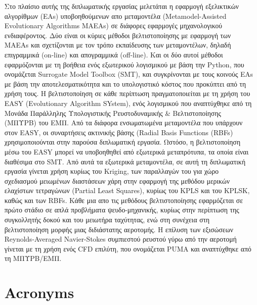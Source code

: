 \documentclass[twoside, 12pt,notitlepage]{report}
\begin{document}
Στο πλαίσιο αυτής της διπλωματικής εργασίας μελετάται η 
εφαρμογή εξελικτικών αλγορίθμων (EAs) υποβοηθούμενων απο 
μεταμοντέλα (Metamodel-Assisted Evolutionary Algorithms MAEAs) σε 
διάφορες εφαρμογές μηχανολογικού ενδιαφέροντος. Δύο είναι οι κύριες 
μέθοδοι βελτιστοποίησης με εφαρμογή των MAEAs και σχετίζονται με 
τον τρόπο εκπαίδευσης των μεταμοντέλων, δηλαδή επιγραμμικά 
(on-line) και απογραμμικά (off-line). Και οι δύο αυτοί μέθοδοι 
εφαρμόζονται με τη βοήθεια ενός εξωτερικού λογισμικού με βάση την 
Python, που ονομάζεται Surrogate Model Toolbox (SMT), και 
συγκρίνονται με τους κοινούς ΕΑs με βάση την αποτελεσματικότητα και 
το υπολογιστικό κόστος που προκύπτει από τη χρήση τους. Η 
βελτιστοποίηση σε κάθε περίπτωση πραγματοποιείται με τη χρήση του 
EASY (Evolutionary Algorithm SYstem), ενός λογισμικού που 
αναπτύχθηκε από τη Μονάδα Παράλληλης Υπολογιστικής Ρευστοδυναμικής 
\& Βελτιστοποίησης (ΜΠΥΡΒ) του ΕΜΠ. Από τα διάφορα ενσωματωμένα 
μεταμοντέλα που υπάρχουν στον EASY, οι συναρτήσεις ακτινικής 
βάσης (Radial Basis Functions (RBFs) χρησιμοποιούνται στην παρούσα 
διπλωματική εργασία. Ωστόσο, η βελτιστοποίηση μέσω του EASY 
μπορεί να υποβοηθηθεί από εξωτερικά μεταπρότυπα, τα οποία είναι 
διαθέσιμα στο SMT. Από αυτά τα εξωτερικά μεταμοντέλα, σε αυτή τη 
διπλωματική εργασία γίνεται χρήση κυρίως του Kriging, των 
παραλλαγών του για χώρο σχεδιασμού μειωμένων διαστάσεων χάρη στην 
εφαρμογή της μεθόδου μερικών ελαχίστων τετραγώνων (Partial Least 
Squares), κυρίως του KPLS και του KPLSK, καθώς και των RBFs. Κάθε 
μια απο τις μεθόδους βελτιστοποίησης εφαρμόζεται σε πρώτο στάδιο σε 
απλά προβλήματα ψευδο-μηχανικής, κυρίως στην περίπτωση της 
συγκολλητής δοκού και του μειωτήρα ταχύτητας, ενώ στη 
συνέχεια στη βελτιστοποίηση μορφής μιας διδιάστατης αεροτομής. Η 
επίλυση των εξισώσεων Reynolds-Averaged Navier-Stokes συμπιεστού 
ρευστού γύρω από την αεροτομή γίνεται με τη χρήση ενός CFD επιλύτη, 
που ονομάζεται PUMA και αναπτύχθηκε από τη ΜΠΥΡΒ/ΕΜΠ.

\newpage

\chapter*{Acronyms}
\end{document}
